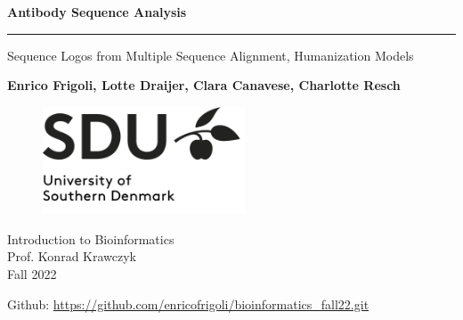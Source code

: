 \begin{titlepage}
    \begin{center}
        \vspace*{1cm}
        
        \Huge
        \textbf{Antibody Sequence Analysis}

        \vspace{0.3cm}

        \rule{\textwidth}{.4pt}

        \vspace{0.5cm}
        
        \LARGE
        Sequence Logos from Multiple Sequence Alignment, Humanization Models 
        
        \vspace{5mm}
        
        \large
        \textbf{Enrico Frigoli, Lotte Draijer, Clara Canavese, Charlotte Resch}
         \vfill
        \begin{figure}[h]
		\includegraphics[width=6cm]{sdu_logo_complete.png}
		\centering
	\end{figure}
  
        
        \vspace{10mm}
	\large
	Introduction to Bioinformatics  \\
	Prof. Konrad Krawczyk \\
	Fall 2022
        
        \vspace{5mm}
            
        Github: \href{https://github.com/enricofrigoli/bioinformatics\_fall22.git}{https://github.com/enricofrigoli/bioinformatics\_fall22.git}
        
		
        
    
        

		
        
    \end{center}

\end{titlepage}